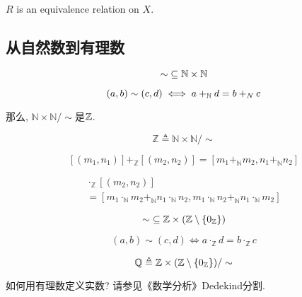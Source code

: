 \begin{theorem}
    $R$ is an equivalence relation on  $X$.
\end{theorem}

\subsection{从自然数到有理数}

\begin{definition}
  \[
    \sim\; \subseteq \mathbb{N} \times \mathbb{N}
  \]

  \[
    (a, b) \sim (c, d) \iff a +_{\mathbb{N}} d = b +_{N} c
  \]
\end{definition}

那么, $\mathbb{N} \times \mathbb{N}/\sim$是$\mathbb{Z}$. 

\begin{definition}[$\mathbb{Z}$]
  \[
    \mathbb{Z} \triangleq \mathbb{N} \times \mathbb{N}/\sim
  \]
\end{definition}

\begin{definition}[$+_\mathbb{Z}$]
  \[
    [(m_1, n_1)] +_{\mathbb{Z}} [(m_2, n_2)] = [m_1 +_{\mathbb{N}} m_2, n_1 +_{\mathbb{N}} n_2]
  \]
\end{definition}

\begin{definition}
  \begin{gather*}
    [(m_1, n_1)] \cdot_{\mathbb{Z}} [(m_2, n_2)] \\
    = [m_1 \cdot_{\mathbb{N}} m_2 +_{\mathbb{N}} n_1 \cdot_{\mathbb{N}} n_2,
       m_1 \cdot_{\mathbb{N}} n_2 +_{\mathbb{N}} n_1 \cdot_{\mathbb{N}} m_2]
  \end{gather*}
\end{definition}

\begin{definition}
  \[
    \sim\; \subseteq \mathbb{Z} \times (\mathbb{Z} \setminus \{0_{\mathbb{Z}}\})
  \]

  \[
    (a, b) \sim (c, d) \iff a \cdot_{\mathbb{Z}} d = b \cdot_{\mathbb{Z}} c
  \]
\end{definition}

\begin{definition}[$\mathbb{Q}$]
  \[
    \mathbb{Q} \triangleq \mathbb{Z} \times (\mathbb{Z} \setminus \{0_{\mathbb{Z}}\})/\sim
  \]
\end{definition}

如何用有理数定义实数? 请参见《数学分析》Dedekind分割. 


